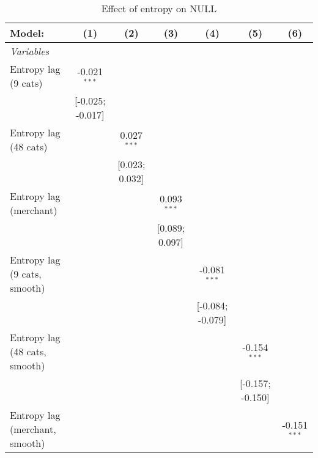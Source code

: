 
\begin{table}[htbp]
   \centering
   \tiny
   \begin{threeparttable}[b]
      \caption{\label{tab:reg_dspend_main} Effect of entropy on NULL}
      \begin{tabular}{lcccccc}
         \tabularnewline \midrule \midrule
         Model:                         & (1)              & (2)             & (3)             & (4)              & (5)              & (6)\\  
         \midrule
         \emph{Variables}\\
         Entropy lag (9 cats)           & -0.021$^{***}$   &                 &                 &                  &                  &   \\   
                                        & [-0.025; -0.017] &                 &                 &                  &                  &   \\   
         Entropy lag (48 cats)          &                  & 0.027$^{***}$   &                 &                  &                  &   \\   
                                        &                  & [0.023; 0.032]  &                 &                  &                  &   \\   
         Entropy lag (merchant)         &                  &                 & 0.093$^{***}$   &                  &                  &   \\   
                                        &                  &                 & [0.089; 0.097]  &                  &                  &   \\   
         Entropy lag (9 cats, smooth)   &                  &                 &                 & -0.081$^{***}$   &                  &   \\   
                                        &                  &                 &                 & [-0.084; -0.079] &                  &   \\   
         Entropy lag (48 cats, smooth)  &                  &                 &                 &                  & -0.154$^{***}$   &   \\   
                                        &                  &                 &                 &                  & [-0.157; -0.150] &   \\   
         Entropy lag (merchant, smooth) &                  &                 &                 &                  &                  & -0.151$^{***}$\\   

\end{tabular}
\end{threeparttable}
\end{table}
